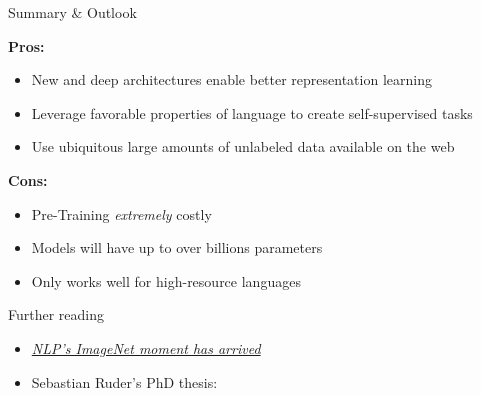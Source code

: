 \documentclass[]{beamer}
\begin{document}
\begin{frame}{Summary \& Outlook}

	\textbf{Pros:}

	\begin{itemize}
		\item New and deep architectures enable better representation learning 
		\item Leverage favorable properties of language to create self-supervised tasks
		\item Use ubiquitous large amounts of unlabeled data available on the web
	\end{itemize}
	
	\vspace{.3cm}
	
	\textbf{Cons:}
	
	\begin{itemize}
		\item Pre-Training \textit{extremely} costly
		\item Models will have up to over billions parameters 
		\item Only works well for high-resource languages
	\end{itemize}
\end{frame}



\begin{frame}{Further reading}

	\begin{itemize}
		\item \href{https://thegradient.pub/nlp-imagenet/}{\textit{NLP's ImageNet moment has arrived}}
		\item Sebastian Ruder's PhD thesis: \href{https://ruder.io/thesis/}{}
	\end{itemize}
	
\end{frame}
\end{document}
